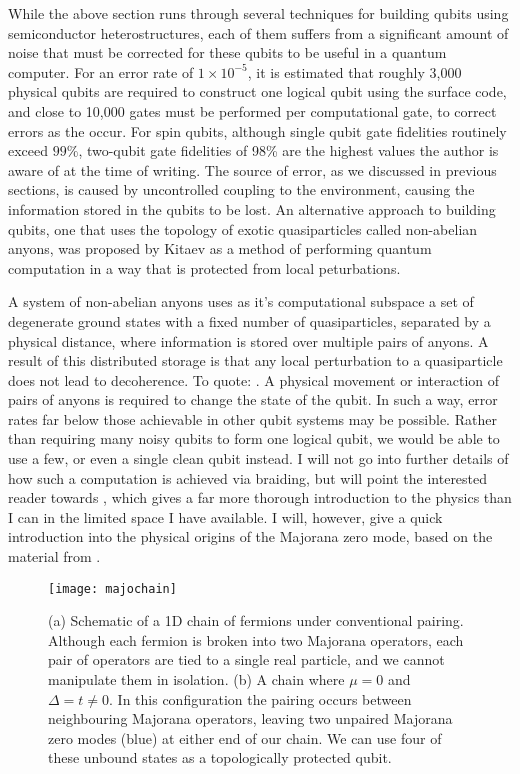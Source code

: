 While the above section runs through several techniques for building qubits using semiconductor heterostructures,
each of them suffers from a significant amount of noise that must be corrected for these qubits to be useful
in a quantum computer. For an error rate of $1 \times 10^{-5}$, it is estimated that roughly 3,000 physical qubits
are required to construct one logical qubit using the surface code, and close to 10,000 gates must be performed per computational gate, to correct
errors as the occur\cite{6657074}. For spin qubits, although single qubit gate fidelities routinely exceed $99\%$\cite{Zajac439}, two-qubit
gate fidelities of 98\% are the highest values the author is aware of at the time of writing\cite{PhysRevA.99.042310}.
The source of error, as we discussed in previous sections, is caused by uncontrolled coupling to the environment, causing the information stored in the qubits
to be lost. An alternative approach to building qubits, one that uses the topology of exotic quasiparticles called non-abelian anyons,
was proposed by Kitaev as a method of performing quantum computation in a way that is protected from local peturbations\cite{KITAEV20032}.

A system of non-abelian anyons uses as it's computational subspace a set of degenerate ground states with a fixed number
of quasiparticles, separated by a physical distance, where information is stored over multiple pairs of anyons. A result of this
distributed storage is that any local perturbation to a quasiparticle does not
lead to decoherence. To quote: . A physical movement or
interaction of pairs of anyons is required to change the state of the qubit. In such a way, error rates
far below those achievable in other qubit systems may be possible. Rather than requiring many noisy qubits to form one logical qubit,
we would be able to use a few, or even a single clean qubit instead. I will not go into further details of how such a computation
is achieved via braiding, but will point the interested reader towards \cite{RevModPhys.80.1083}, which
gives a far more thorough introduction to the physics than I can in the limited space I have available. I will, however, give a quick introduction
into the physical origins of the Majorana zero mode, based on the material from \cite{rafael_notes}.

\begin{figure}
  \texttt{[image: majochain]}
  \caption[1D chain of fermions, forming a Majorana zero modes]
  {\label{fig:majo}(a) Schematic of a 1D chain of fermions under conventional pairing. Although each fermion is broken into two
  Majorana operators, each pair of operators are tied to a single real particle, and we cannot manipulate them in isolation.
  (b) A chain where $\mu = 0$ and $\Delta = t \neq 0$. In this configuration the pairing occurs between neighbouring Majorana operators,
  leaving two unpaired Majorana zero modes (blue) at either end of our chain. We can use four of these unbound states as a
  topologically protected qubit.}
\end{figure}

